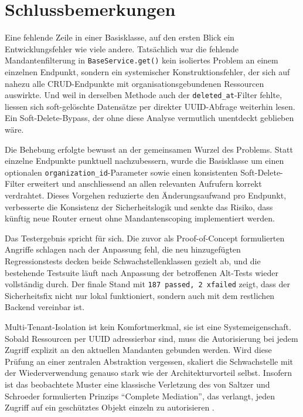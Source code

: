 \section{Schlussbemerkungen}
\label{sec:schluss}

Eine fehlende Zeile in einer Basisklasse, auf den ersten Blick ein
Entwicklungsfehler wie viele andere. Tatsächlich war die fehlende
Mandantenfilterung in \texttt{BaseService.get()} kein isoliertes Problem an
einem einzelnen Endpunkt, sondern ein systemischer Konstruktionsfehler, der
sich auf nahezu alle CRUD-Endpunkte mit organisationsgebundenen Ressourcen
auswirkte. Und weil in derselben Methode auch der \texttt{deleted\_at}-Filter
fehlte, liessen sich soft-gelöschte Datensätze per direkter UUID-Abfrage
weiterhin lesen. Ein Soft-Delete-Bypass, der ohne diese Analyse vermutlich
unentdeckt geblieben wäre.

Die Behebung erfolgte bewusst an der gemeinsamen Wurzel des Problems. Statt
einzelne Endpunkte punktuell nachzubessern, wurde die Basisklasse um einen
optionalen \texttt{organization\_id}-Parameter sowie einen konsistenten
Soft-Delete-Filter erweitert und anschliessend an allen relevanten Aufrufern
korrekt verdrahtet. Dieses Vorgehen reduzierte den Änderungsaufwand pro
Endpunkt, verbesserte die Konsistenz der Sicherheitslogik und senkte das Risiko,
dass künftig neue Router erneut ohne Mandantenscoping implementiert werden.

Das Testergebnis spricht für sich. Die zuvor als
Proof-of-Concept formulierten Angriffe schlagen nach der Anpassung fehl, die neu
hinzugefügten Regressionstests decken beide Schwachstellenklassen gezielt ab,
und die bestehende Testsuite läuft nach Anpassung der betroffenen Alt-Tests
wieder vollständig durch. Der finale Stand mit \texttt{187 passed, 2 xfailed}
zeigt, dass der Sicherheitsfix nicht nur lokal funktioniert, sondern auch mit
dem restlichen Backend vereinbar ist.

Multi-Tenant-Isolation ist kein Komfortmerkmal, sie ist eine
Systemeigenschaft. Sobald Ressourcen per UUID adressierbar sind, muss die
Autorisierung bei jedem Zugriff explizit an den aktuellen Mandanten
gebunden werden. Wird diese Prüfung an einer zentralen Abstraktion
vergessen, skaliert die Schwachstelle mit der Wiederverwendung genauso
stark wie der Architekturvorteil selbst. Insofern ist das beobachtete
Muster eine klassische Verletzung des von Saltzer und Schroeder
formulierten Prinzips \enquote{Complete Mediation}, das verlangt, jeden
Zugriff auf ein geschütztes Objekt einzeln zu autorisieren
\parencite{saltzer_schroeder_1975}.

